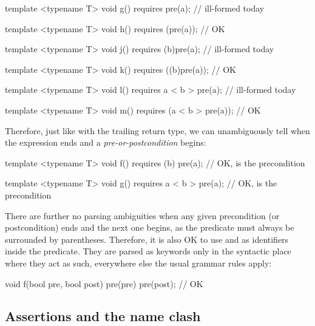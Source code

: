 \vspace{2mm}
\begin{codeblock}
template <typename T>
void g() requires pre(a);   // ill-formed today

template <typename T>
void h() requires (pre(a));   // OK

template <typename T>
void j() requires (b)pre(a);   // ill-formed today

template <typename T>
void k() requires ((b)pre(a));   // OK

template <typename T>
void l() requires a < b > pre(a);   // ill-formed today

template <typename T>
void m() requires (a < b > pre(a));   // OK

\end{codeblock}
\vspace{2mm}

Therefore, just like with the trailing return type, we can unambiguously tell when the expression ends and a \emph{pre-or-postcondition} begins:

\vspace{2mm}
\begin{codeblock}
template <typename T>
void f() requires (b) pre(a);   // OK,  is the precondition

template <typename T>
void g() requires a < b > pre(a);   // OK,  is the precondition
\end{codeblock}
\vspace{2mm}

There are further no parsing ambiguities when any given precondition (or postcondition) ends and the next one begins, as the predicate must always be surrounded by parentheses. Therefore, it is also OK to use  and  as identifiers inside the predicate. They are parsed as keywords only in the syntactic place where they act as such, everywhere else the usual grammar rules apply:

\vspace{2mm}
\begin{codeblock}
void f(bool pre, bool post)
  pre(pre) pre(post);   // OK
\end{codeblock}
\vspace{2mm}


\subsection{Assertions and the  name clash}
\label{subsec:assrt}

